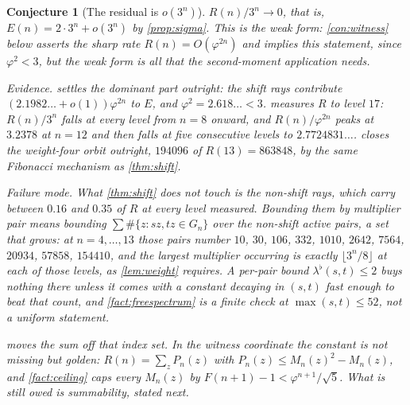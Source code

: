 \documentclass[11pt]{amsart}
\newtheorem{conjecture}[theorem]{Conjecture}
\theoremstyle{definition}
\theoremstyle{remark}
\begin{document}
\begin{conjecture}[The residual is $o(3^n)$]
\label{con:residual}
$R(n)/3^n\to 0$, that is, $E(n)=2\cdot 3^n+o(3^n)$ by \cref{prop:sigma}. This is the weak form: \cref{con:witness} below asserts the sharp rate $R(n)=O(\varphi^{2n})$ and implies this statement, since $\varphi^2<3$, but the weak form is all that the second-moment application needs.
\smallskip

\noindent\emph{Evidence.}  settles the dominant part outright: the shift rays contribute $(2.1982\ldots+o(1))\varphi^{2n}$ to $E$, and $\varphi^2=2.618\ldots<3$.  measures $R$ to level $17$: $R(n)/3^n$ falls at every level from $n=8$ onward, and $R(n)/\varphi^{2n}$ peaks at $3.2378$ at $n=12$ and then falls at five consecutive levels to $2.7724831\ldots$.  closes the weight-four orbit outright, $194096$ of $R(13)=863848$, by the same Fibonacci mechanism as \cref{thm:shift}.
\smallskip

\noindent\emph{Failure mode.} What \cref{thm:shift} does not touch is the non-shift rays, which carry between $0.16$ and $0.35$ of $R$ at every level measured. Bounding them by multiplier pair means bounding $\sum \#\{z: sz,tz\in G_n\}$ over the non-shift active pairs, a set that grows: at $n=4,\dots,13$ those pairs number $10$, $30$, $106$, $332$, $1010$, $2642$, $7564$, $20934$, $57858$, $154410$, and the largest multiplier occurring is exactly $\lfloor 3^n/8\rfloor$ at each of those levels, as \cref{lem:weight} requires. A per-pair bound $\lambda^\flat(s,t)\le 2$ buys nothing there unless it comes with a constant decaying in $(s,t)$ fast enough to beat that count, and \cref{fact:freespectrum} is a finite check at $\max(s,t)\le 52$, not a uniform statement.

 moves the sum off that index set. In the witness coordinate the constant is not missing but golden: $R(n)=\sum_z P_n(z)$ with $P_n(z)\le M_n(z)^2-M_n(z)$, and \cref{fact:ceiling} caps every $M_n(z)$ by $F(n+1)-1<\varphi^{n+1}/\sqrt5$. What is still owed is summability, stated next.
\end{conjecture}
\end{document}
